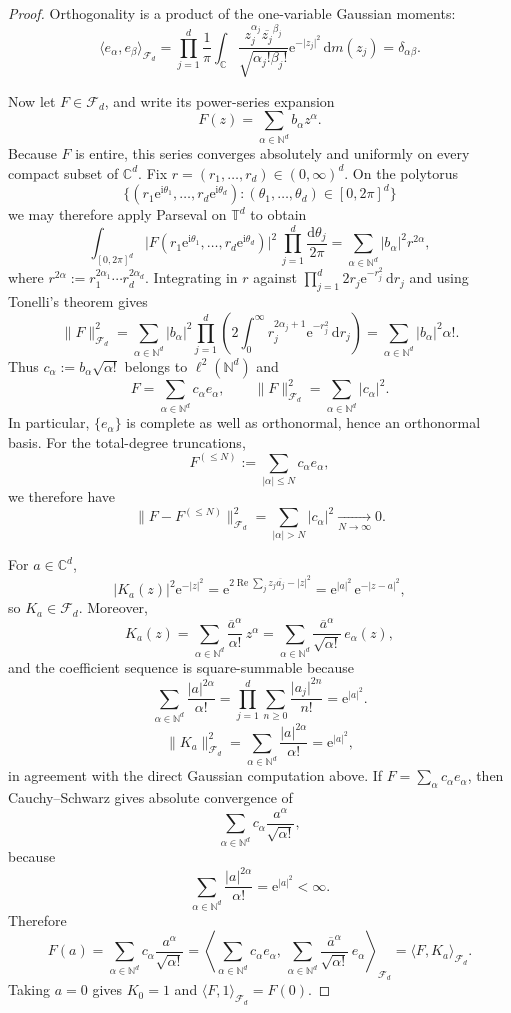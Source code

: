 \documentclass[11pt]{amsart}
\theoremstyle{remark}
\newcommand{\C}{\mathbb{C}}
\newcommand{\N}{\mathbb{N}}
\newcommand{\abs}[1]{\lvert #1 \rvert}
\newcommand{\norm}[1]{\lVert #1 \rVert}
\newcommand{\dd}{\mathrm{d}}
\newcommand{\ee}{\mathrm{e}}
\newcommand{\ii}{\mathrm{i}}
\newcommand{\Fd}{\mathcal{F}_d}
\begin{document}
\begin{proof}
Orthogonality is a product of the one-variable Gaussian moments:
\[
\langle e_\alpha,e_\beta\rangle_{\Fd}
=
\prod_{j=1}^d
\frac{1}{\pi}\int_{\C}
\frac{z_j^{\alpha_j}\overline{z_j}^{\beta_j}}{\sqrt{\alpha_j!\beta_j!}}
\ee^{-\abs{z_j}^2}\,\dd m(z_j)
=
\delta_{\alpha\beta}.
\]

Now let $F \in \Fd$, and write its power-series expansion
\[
F(z) = \sum_{\alpha \in \N^d} b_\alpha z^\alpha.
\]
Because $F$ is entire, this series converges absolutely and uniformly on
every compact subset of $\C^d$.  Fix
$r=(r_1,\dots,r_d)\in(0,\infty)^d$.  On the polytorus
\[
\bigl\{(r_1 \ee^{\ii\theta_1},\dots,r_d \ee^{\ii\theta_d}) :
(\theta_1,\dots,\theta_d)\in[0,2\pi]^d\bigr\}
\]
we may therefore apply Parseval on $\mathbb T^d$ to obtain
\[
\int_{[0,2\pi]^d}
\abs{F(r_1 \ee^{\ii\theta_1},\dots,r_d \ee^{\ii\theta_d})}^2\,
\prod_{j=1}^d \frac{\dd\theta_j}{2\pi}
=
\sum_{\alpha \in \N^d} \abs{b_\alpha}^2 r^{2\alpha},
\]
where $r^{2\alpha}:=r_1^{2\alpha_1}\cdots r_d^{2\alpha_d}$.  Integrating in
$r$ against $\prod_{j=1}^d 2 r_j \ee^{-r_j^2}\,\dd r_j$ and using Tonelli's
theorem gives
\[
\norm{F}_{\Fd}^2
=
\sum_{\alpha \in \N^d} \abs{b_\alpha}^2
\prod_{j=1}^d
\left(
2\int_0^\infty r_j^{2\alpha_j+1}\ee^{-r_j^2}\,\dd r_j
\right)
=
\sum_{\alpha \in \N^d} \abs{b_\alpha}^2 \alpha!.
\]
Thus $c_\alpha := b_\alpha \sqrt{\alpha!}$ belongs to $\ell^2(\N^d)$ and
\[
F
=
\sum_{\alpha \in \N^d} c_\alpha e_\alpha,
\qquad
\norm{F}_{\Fd}^2
=
\sum_{\alpha \in \N^d} \abs{c_\alpha}^2.
\]
In particular, $\{e_\alpha\}$ is complete as well as orthonormal, hence an
orthonormal basis.  For the total-degree truncations,
\[
F^{(\le N)} := \sum_{\abs{\alpha}\le N} c_\alpha e_\alpha,
\]
we therefore have
\[
\norm{F - F^{(\le N)}}_{\Fd}^2
=
\sum_{\abs{\alpha}>N} \abs{c_\alpha}^2
\xrightarrow[N\to\infty]{} 0.
\]

For $a \in \C^d$,
\[
\abs{K_a(z)}^2 \ee^{-\abs{z}^2}
=
\ee^{2\operatorname{Re}\sum_j z_j\overline{a_j} - \abs{z}^2}
=
\ee^{\abs{a}^2}\,\ee^{-\abs{z-a}^2},
\]
so $K_a \in \Fd$.  Moreover,
\[
K_a(z)
=
\sum_{\alpha \in \N^d} \frac{\overline{a}^\alpha}{\alpha!}\, z^\alpha
=
\sum_{\alpha \in \N^d} \frac{\overline{a}^\alpha}{\sqrt{\alpha!}}\, e_\alpha(z),
\]
and the coefficient sequence is square-summable because
\[
\sum_{\alpha \in \N^d} \frac{\abs{a}^{2\alpha}}{\alpha!}
=
\prod_{j=1}^d \sum_{n\ge0}\frac{\abs{a_j}^{2n}}{n!}
=
\ee^{\abs{a}^2}.
\]
\[
\norm{K_a}_{\Fd}^2
=
\sum_{\alpha \in \N^d} \frac{\abs{a}^{2\alpha}}{\alpha!}
=
\ee^{\abs{a}^2},
\]
in agreement with the direct Gaussian computation above.  If
$F=\sum_\alpha c_\alpha e_\alpha$, then
Cauchy--Schwarz gives absolute convergence of
\[
\sum_{\alpha \in \N^d} c_\alpha \frac{a^\alpha}{\sqrt{\alpha!}},
\]
because
\[
\sum_{\alpha \in \N^d} \frac{\abs{a}^{2\alpha}}{\alpha!}
=
\ee^{\abs{a}^2}
<
\infty.
\]
Therefore
\[
F(a)
=
\sum_{\alpha \in \N^d} c_\alpha \frac{a^\alpha}{\sqrt{\alpha!}}
=
\left\langle
\sum_{\alpha \in \N^d} c_\alpha e_\alpha,\,
\sum_{\alpha \in \N^d} \frac{\overline{a}^\alpha}{\sqrt{\alpha!}}\,e_\alpha
\right\rangle_{\Fd}
=
\langle F, K_a\rangle_{\Fd}.
\]
Taking $a=0$ gives $K_0=1$ and $\langle F,1\rangle_{\Fd}=F(0)$.
\end{proof}
\end{document}
